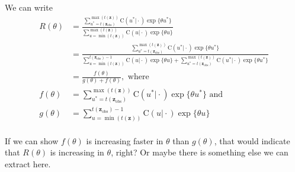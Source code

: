 \documentclass{article}
\begin{document}
We can write 
\begin{align*}
  R(\theta) &= \frac
  {\sum_{u^* = t(\mathbf{z}_{\text{obs}})}^{\max(t(\mathbf{z}))} \text{C}(u^* \vert \cdot) \exp\{\theta u^*\}}
  {\sum_{u = \min(t(\mathbf{z}))}^{\max(t(\mathbf{z}))} \text{C}(u \vert \cdot) \exp\{\theta u\}} \\
  &= \frac
  {\sum_{u^* = t(\mathbf{z}_{\text{obs}})}^{\max(t(\mathbf{z}))} \text{C}(u^* \vert \cdot) \exp\{\theta u^*\}}
  {\sum_{u = \min(t(\mathbf{z}))}^{t(\mathbf{z}_{\text{obs}})-1} \text{C}(u \vert \cdot) \exp\{\theta u\} + 
  \sum_{u^* = t(\mathbf{z}_{\text{obs}})}^{\max(t(\mathbf{z}))} \text{C}(u^* \vert \cdot) \exp\{\theta u^*\}} \\
  &= \frac{f(\theta)}{g(\theta) + f(\theta)}, \text{ where } \\
  f(\theta) &= \sum_{u^* = t(\mathbf{z}_{\text{obs}})}^{\max(t(\mathbf{z}))} \text{C}(u^* \vert \cdot) \exp\{\theta u^*\} \text{ and } \\
  g(\theta) &= \sum_{u = \min(t(\mathbf{z}))}^{t(\mathbf{z}_{\text{obs}})-1} \text{C}(u \vert \cdot) \exp\{\theta u\} \\
\end{align*}

If we can show $f(\theta)$ is increasing faster in $\theta$ than $g(\theta)$, that would indicate that $R(\theta)$ is increasing in $\theta$, right? Or maybe there is something else we can extract here. 
\end{document}
